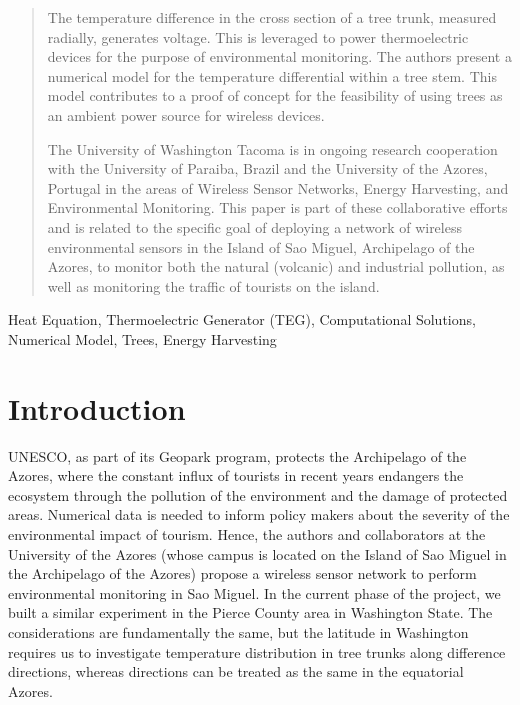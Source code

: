 \documentclass{IEEEtran} %
\begin{document}
\begin{abstract}
The temperature difference in the cross section of a tree trunk, measured radially, generates voltage. This is leveraged to power thermoelectric devices for the purpose of environmental monitoring. The authors present a numerical model for the temperature differential within a tree stem. This model contributes to a proof of concept for the feasibility of using trees as an ambient power source for wireless devices.

The University of Washington Tacoma is in ongoing research cooperation with the University of Paraiba, Brazil and the University of the Azores, Portugal in the areas of Wireless Sensor Networks, Energy Harvesting, and Environmental Monitoring. This paper is part of these collaborative efforts and is related to the specific goal of deploying a network of wireless environmental sensors in the Island of Sao Miguel, Archipelago of the Azores, to monitor both the natural (volcanic) and industrial pollution, as well as monitoring the traffic of tourists on the island.
\end{abstract}

\begin{IEEEkeywords}
Heat Equation, Thermoelectric Generator (TEG), Computational Solutions, Numerical Model, Trees, Energy Harvesting
\end{IEEEkeywords}

\section{Introduction}
UNESCO, as part of its Geopark program, protects the Archipelago of the Azores, where the constant influx of tourists in recent years endangers the ecosystem through the pollution of the environment and the damage of protected areas. Numerical data is needed to inform policy makers about the severity of the environmental impact of tourism. Hence, the authors and collaborators at the University of the Azores (whose campus is located on the Island of Sao Miguel in the Archipelago of the Azores) propose a wireless sensor network to perform environmental monitoring  in Sao Miguel. In the current phase of the project, we built a similar experiment in the Pierce County area in Washington State. The considerations are fundamentally the same, but the latitude in Washington requires us to investigate temperature distribution in tree trunks along difference directions, whereas directions can be treated as the same in the equatorial Azores.
\end{document}
